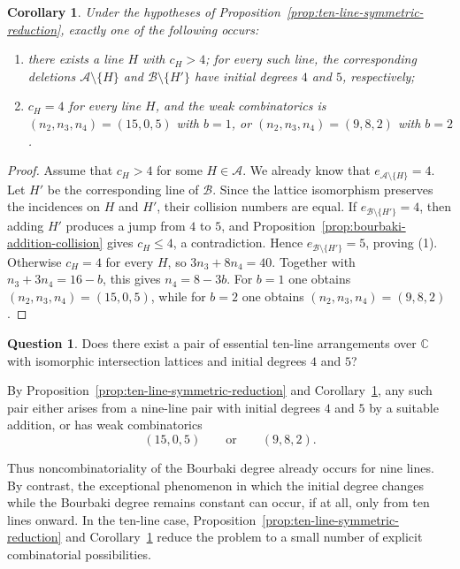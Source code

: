 \documentclass[11pt]{amsart}   %
\newtheorem{Corollary}[Theorem]{Corollary}
\theoremstyle{definition}
\newtheorem{Question}[Theorem]{Question}
\def\NZQ{\mathbb}               %
\def\CC{{\NZQ C}}
\def\A{{\mathcal A}}
\def\B{{\mathcal B}}
\begin{document}
\begin{Corollary}
\label{cor:ten-line-symmetric-deletion-dichotomy}
Under the hypotheses of Proposition~\ref{prop:ten-line-symmetric-reduction}, exactly one of the following occurs:
\begin{enumerate}
\item there exists a line $H$ with $c_H>4$; for every such line, the
corresponding deletions $\A\setminus\{H\}$ and $\B\setminus\{H'\}$ have initial degrees $4$ and $5$, respectively;

\item $c_H=4$ for every line $H$, and the weak combinatorics is
$(n_2,n_3,n_4)=(15,0,5)$ with $b=1$, or $(n_2,n_3,n_4)=(9,8,2)$ with $b=2$.
\end{enumerate}
\end{Corollary}

\begin{proof}
Assume that $c_H>4$ for some $H\in\A$. We already know that $e_{\A\setminus\{H\}}=4$. Let $H'$ be the corresponding line of $\B$. Since the lattice isomorphism preserves the incidences on $H$ and $H'$, their collision numbers are equal. If $e_{\B\setminus\{H'\}}=4$, then adding $H'$ produces a jump from $4$ to $5$, and Proposition~\ref{prop:bourbaki-addition-collision} gives $c_H\leq4$, a contradiction. Hence $e_{\B\setminus\{H'\}}=5$, proving (1). Otherwise $c_H=4$ for every $H$, so $3n_3+8n_4=40.$ Together with $n_3+3n_4=16-b$, this gives $n_4=8-3b$. For $b=1$ one obtains $(n_2,n_3,n_4)=(15,0,5)$, while for $b=2$ one obtains $(n_2,n_3,n_4)=(9,8,2)$.
\end{proof}

\begin{Question}
\label{prob:ten-line-symmetric-bourbaki}
Does there exist a pair of essential ten-line arrangements over $\CC$ with isomorphic intersection lattices and initial degrees $4$ and $5$?

By Proposition~\ref{prop:ten-line-symmetric-reduction} and Corollary~\ref{cor:ten-line-symmetric-deletion-dichotomy}, any such pair either arises from a nine-line pair with initial degrees $4$ and $5$ by a suitable addition, or has weak combinatorics
\[
(15,0,5) \qquad\text{or}\qquad (9,8,2).
\]
\end{Question}
Thus noncombinatoriality of the Bourbaki degree already occurs for nine lines. By contrast, the exceptional phenomenon in which the initial degree changes while the Bourbaki degree remains constant can occur, if at all, only from ten lines onward. In the ten-line case, Proposition~\ref{prop:ten-line-symmetric-reduction} and Corollary~\ref{cor:ten-line-symmetric-deletion-dichotomy} reduce the problem to a small number of explicit combinatorial possibilities.
\end{document}

